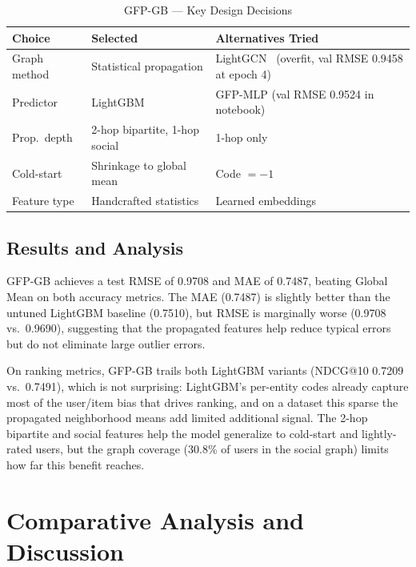\documentclass[conference]{IEEEtran}
\begin{document}
\begin{table}[htbp]
\caption{GFP-GB --- Key Design Decisions}
\label{tab:decisions-gfp}
\centering
\begin{tabular}{p{2.0cm}p{2.2cm}p{3.0cm}}
\toprule
\textbf{Choice} & \textbf{Selected} & \textbf{Alternatives Tried} \\
\midrule
Graph method & Statistical propagation & LightGCN~\cite{he2020lightgcn} (overfit, val RMSE 0.9458 at epoch 4) \\
Predictor & LightGBM & GFP-MLP (val RMSE 0.9524 in notebook) \\
Prop.\ depth & 2-hop bipartite, 1-hop social & 1-hop only \\
Cold-start & Shrinkage to global mean & Code $= -1$ \\
Feature type & Handcrafted statistics & Learned embeddings \\
\bottomrule
\end{tabular}
\end{table}

\subsection{Results and Analysis}

GFP-GB achieves a test RMSE of 0.9708 and MAE of 0.7487, beating Global Mean 
on both accuracy metrics. The MAE (0.7487) is slightly better than the untuned 
LightGBM baseline (0.7510), but RMSE is marginally worse (0.9708 vs.\ 0.9690),
suggesting that the propagated features help reduce typical errors but do not 
eliminate large outlier errors.

On ranking metrics, GFP-GB trails both LightGBM variants 
(NDCG@10 0.7209 vs.\ 0.7491), which is not surprising: LightGBM's per-entity
codes already capture most of the user/item bias that drives ranking, and on 
a dataset this sparse the propagated neighborhood means add limited additional 
signal. The 2-hop bipartite and social features help the model generalize to 
cold-start and lightly-rated users, but the graph coverage (30.8\% of users in 
the social graph) limits how far this benefit reaches.

\section{Comparative Analysis and Discussion}
\label{sec:comparison}
\end{document}
